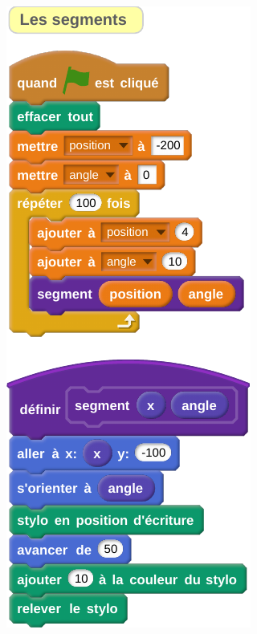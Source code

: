 \documentclass[class=report,crop=false, 12pt]{standalone}
\begin{document}
\begin{code}
{\includegraphics[scale=\scalesolution,scale=1]{code-11-ex3c}
}    
\end{code}
\fi
\end{document}
